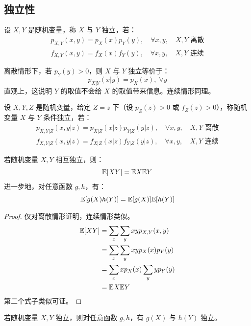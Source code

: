 \subsection{独立性}

\begin{definition}[独立]
设 $X,Y$ 是随机变量，称 $X$ 与 $Y$ 独立，若：
\begin{gather*}
p_{X,Y}(x,y)=p_X(x)p_Y(y),\quad\forall x,y,\quad\text{$X,Y$ 离散}\\
f_{X,Y}(x,y)=f_X(x)f_Y(y),\quad\forall x,y,\quad\text{$X,Y$ 连续}
\end{gather*}
\end{definition}
\begin{com}
离散情形下，若 $p_Y(y)>0$，则 $X$ 与 $Y$ 独立等价于：
\[p_{X\vert Y}(x\vert y)=p_X(x),\;\forall y\]
直观上，这说明 $Y$ 的取值不会给 $X$ 的取值带来信息。连续情形同理。
\end{com}

\begin{definition}[条件独立]
设 $X,Y,Z$ 是随机变量，给定 $Z=z$ 下（设 $p_Z(z)>0$ 或 $f_Z(z)>0$），称随机变量 $X$ 与 $Y$ 条件独立，若：
\begin{gather*}
p_{X,Y\vert Z}(x,y\vert z)=p_{X\vert Z}(x\vert z)p_{Y\vert Z}(y\vert z),\quad\forall x,y,\quad\text{$X,Y$ 离散}\\
f_{X,Y\vert Z}(x,y\vert z)=f_{X\vert Z}(x\vert z)f_{Y\vert Z}(y\vert z),\quad\forall x,y,\quad\text{$X,Y$ 连续}
\end{gather*}
\end{definition}

\begin{theorem}
若随机变量 $X,Y$ 相互独立，则：
\[
\mathbb{E}[XY]=\mathbb{E} X\mathbb{E} Y
\]
进一步地，对任意函数 $g,h$，有：
\[
\mathbb{E}[g(X)h(Y)]=\mathbb{E}[g(X)]\mathbb{E}[h(Y)]
\]
\end{theorem}
\begin{proof}
仅对离散情形证明，连续情形类似。
\begin{align*}
\mathbb{E}[XY]&=\sum_x\sum_y xyp_{X,Y}(x,y)\\
&=\sum_x\sum_y xyp_X(x)p_Y(y)\\
&=\sum_x xp_X(x)\sum_y yp_Y(y)\\
&=\mathbb{E} X\mathbb{E} Y
\end{align*}
第二个式子类似可证。
\end{proof}

\begin{corollary}
若随机变量 $X,Y$ 独立，则对任意函数 $g,h$，有 $g(X)$ 与 $h(Y)$ 独立。
\end{corollary}

